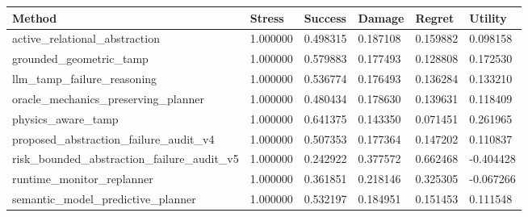 \begin{tabular}{llllll}
\toprule
Method & Stress & Success & Damage & Regret & Utility \\
\midrule
active\_relational\_abstraction & 1.000000 & 0.498315 & 0.187108 & 0.159882 & 0.098158 \\
grounded\_geometric\_tamp & 1.000000 & 0.579883 & 0.177493 & 0.128808 & 0.172530 \\
llm\_tamp\_failure\_reasoning & 1.000000 & 0.536774 & 0.176493 & 0.136284 & 0.133210 \\
oracle\_mechanics\_preserving\_planner & 1.000000 & 0.480434 & 0.178630 & 0.139631 & 0.118409 \\
physics\_aware\_tamp & 1.000000 & 0.641375 & 0.143350 & 0.071451 & 0.261965 \\
proposed\_abstraction\_failure\_audit\_v4 & 1.000000 & 0.507353 & 0.177364 & 0.147202 & 0.110837 \\
risk\_bounded\_abstraction\_failure\_audit\_v5 & 1.000000 & 0.242922 & 0.377572 & 0.662468 & -0.404428 \\
runtime\_monitor\_replanner & 1.000000 & 0.361851 & 0.218146 & 0.325305 & -0.067266 \\
semantic\_model\_predictive\_planner & 1.000000 & 0.532197 & 0.184951 & 0.151453 & 0.111548 \\
\bottomrule
\end{tabular}
